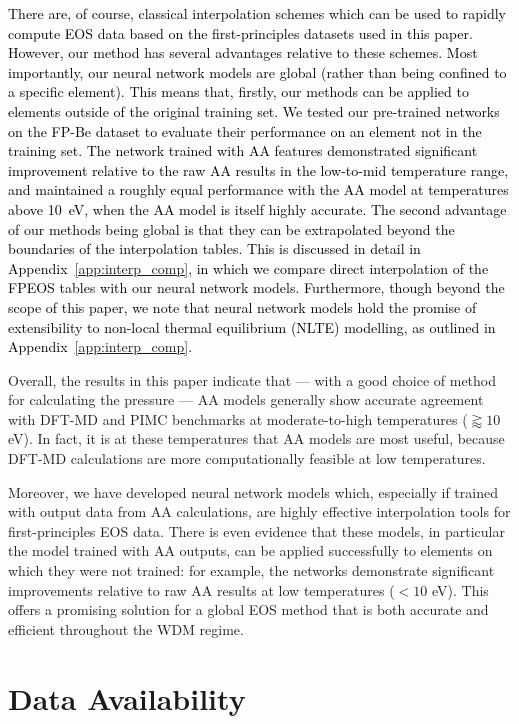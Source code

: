 \documentclass[%
 preprint,
 superscriptaddress,
 amsmath,amssymb,
longbibliography,
]{revtex4-2}
\newcommand{\change}[1]{\textcolor{black}{#1}}
\begin{document}
\change{There are, of course, classical interpolation schemes which can be used to rapidly compute EOS data based on the first-principles datasets used in this paper. However, our method has several advantages relative to these schemes. Most importantly, our neural network models are global (rather than being confined to a specific element). This means that, firstly, our methods can be applied to elements outside of the original training set. We tested our pre-trained networks on the FP-Be dataset \cite{Hu_Be_EOS} to evaluate their performance on an element not in the training set. The network trained with AA features demonstrated significant improvement relative to the raw AA results in the low-to-mid temperature range, and maintained a roughly equal performance with the AA model at temperatures above 10~eV, when the AA model is itself highly accurate. The second advantage of our methods being global is that they can be extrapolated beyond the boundaries of the interpolation tables. This is discussed in detail in Appendix~\ref{app:interp_comp}, in which we compare direct interpolation of the FPEOS tables with our neural network models. Furthermore, though beyond the scope of this paper, we note that neural network models hold the promise of extensibility to non-local thermal equilibrium (NLTE) modelling, as outlined in Appendix~\ref{app:interp_comp}.}


Overall, the results in this paper indicate that --- with a good choice of method for calculating the pressure --- AA models generally show accurate agreement with DFT-MD and PIMC benchmarks at moderate-to-high temperatures ($\gtrapprox 10$ eV). In fact, it is at these temperatures that AA models are most useful, because DFT-MD calculations are more computationally feasible at low temperatures. 

Moreover, we have developed neural network models which, especially if trained with output data from AA calculations, are highly effective interpolation tools for first-principles EOS data. There is even evidence that these models, in particular the model trained with AA outputs, can be applied successfully to elements on which they were not trained: for example, the networks demonstrate significant improvements relative to raw AA results at low temperatures ($<10$ eV). This offers a promising solution for a global EOS method that is both accurate and efficient throughout the WDM regime.

\section*{Data Availability}
\end{document}
